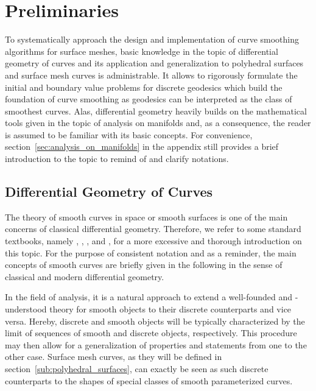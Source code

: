 \documentclass{stdlocal}
\begin{document}
\section{Preliminaries} %
\label{sec:preliminaries}

To systematically approach the design and implementation of curve smoothing algorithms for surface meshes, basic knowledge in the topic of differential geometry of curves and its application and generalization to polyhedral surfaces and surface mesh curves is administrable.
It allows to rigorously formulate the initial and boundary value problems for discrete geodesics which build the foundation of curve smoothing as geodesics can be interpreted as the class of smoothest curves.
Alas, differential geometry heavily builds on the mathematical tools given in the topic of analysis on manifolds and, as a consequence, the reader is assumed to be familiar with its basic concepts.
For convenience, section~\ref{sec:analysis_on_manifolds} in the appendix still provides a brief introduction to the topic to remind of and clarify notations.

\subsection{Differential Geometry of Curves} %
\label{sub:differential_geometry}

  The theory of smooth curves in space or smooth surfaces is one of the main concerns of classical differential geometry.
  Therefore, we refer to some standard textbooks, namely \textcite{goldhorn2009}, \textcite{carmo2016}, \textcite{kuehnel2013}, and \textcite{stahl2013}, for a more excessive and thorough introduction on this topic.
  For the purpose of consistent notation and as a reminder, the main concepts of smooth curves are briefly given in the following in the sense of classical and modern differential geometry.

  In the field of analysis, it is a natural approach to extend a well-founded and -understood theory for smooth objects to their discrete counterparts and vice versa.
  Hereby, discrete and smooth objects will be typically characterized by the limit of sequences of smooth and discrete objects, respectively.
  This procedure may then allow for a generalization of properties and statements from one to the other case.
  Surface mesh curves, as they will be defined in section~\ref{sub:polyhedral_surfaces}, can exactly be seen as such discrete counterparts to the shapes of special classes of smooth parameterized curves.
\end{document}
